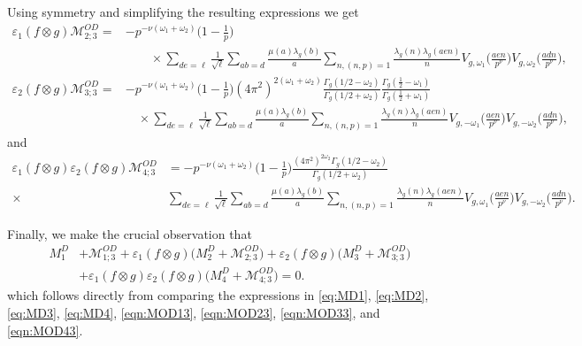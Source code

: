 \documentclass[12pt]{amsart}
\theoremstyle{plain}
\theoremstyle{definition}
\begin{document}
Using symmetry and simplifying the resulting expressions we get
    \begin{align}\label{eqn:MOD23}
    \varepsilon_1(f\otimes g )
    \mathscr{M}^{OD}_{2; 3}
    =&- 
    p^{-\nu(\omega_1+\omega_2)}  \Big(1-\frac1{p}\Big)\nonumber\\&\hspace{2em}\times
     \sum_{de=\ell}
    \frac{1}{\sqrt{\ell}}
    \sum_{ab=d} \frac{\mu(a)  \lambda_g(b)}{a}
    \sum_{n, (n,p)=1}  \frac{\lambda_g(n)  \lambda_g(aen)}{n }
  V_{g, \omega_1}\Big(\frac{aen}{p^\nu}\Big)  V_{g, \omega_2} \Big(\frac{adn}{p^\nu }\Big)    ,
    \end{align}
    \begin{align}\label{eqn:MOD33}
    \varepsilon_2(f\otimes g )
    \mathscr{M}^{OD}_{3;3}
    =&- p^{-\nu(\omega_1+\omega_2)}  \Big(1-\frac1{p}\Big) (4\pi^2)^{2(\omega_1+\omega_2)} \frac{\Gamma_g(1/2-\omega_2)}{ \Gamma_g(1/2+\omega_2)}
    \frac{ \Gamma_g(\frac12-\omega_1)}{ \Gamma_g(\frac12+\omega_1) }\nonumber
    \\
    &\quad \times   \sum_{de=\ell}
    \frac{1}{\sqrt{\ell}}
    \sum_{ab=d} \frac{\mu(a)  \lambda_g(b)}{a}
    \sum_{n, (n,p)=1}  \frac{\lambda_g(n)  \lambda_g(aen)}{n }
   V_{g, -\omega_1}\Big(\frac{aen}{p^\nu}\Big)  V_{g, -\omega_2} \Big(\frac{adn}{p^\nu }\Big)     ,
    \end{align}
and    \begin{align}\label{eqn:MOD43}
      \varepsilon_1(f\otimes g ) \varepsilon_2(f\otimes g )
    \mathscr{M}^{OD}_{4;3}
    &=- p^{-\nu(\omega_1+\omega_2)}  \Big(1-\frac1{p}\Big)\frac{(4\pi^2)^{2\omega_2} \Gamma_g(1/2-\omega_2)}{ \Gamma_g(1/2+\omega_2)}
   \nonumber \\
     \times  & \sum_{de=\ell}
    \frac{1}{\sqrt{\ell}}
    \sum_{ab=d} \frac{\mu(a)  \lambda_g(b)}{a}
    \sum_{n, (n,p)=1}  \frac{\lambda_g(n)  \lambda_g(aen)}{n }
    V_{g, \omega_1}\Big(\frac{aen}{p^\nu}\Big)  V_{g, -\omega_2} \Big(\frac{adn}{p^\nu }\Big) .
    \end{align}
 
 Finally, we make the crucial observation that 
    \begin{align}\label{eqn:MDcancellation}
    M^D_1
    &+ \mathscr{M}^{OD}_{1;3}
    +\varepsilon_1(f\otimes g ) \big(M^D_2+ \mathscr{M}^{OD}_{2;3}\big)
    +\varepsilon_2(f\otimes g ) \big(M^D_3+ \mathscr{M}^{OD}_{3;3}\big)
    \\
    &+\varepsilon_1(f\otimes g ) \varepsilon_2(f\otimes g )\big(M^D_4+ \mathscr{M}^{OD}_{4;3}\big)
    =0\nonumber.
    \end{align}
which follows directly from comparing the expressions in  \eqref{eq:MD1},  \eqref{eq:MD2},  \eqref{eq:MD3},  \eqref{eq:MD4}, \eqref{eqn:MOD13}, \eqref{eqn:MOD23},  \eqref{eqn:MOD33}, and  \eqref{eqn:MOD43}.
\end{document}
